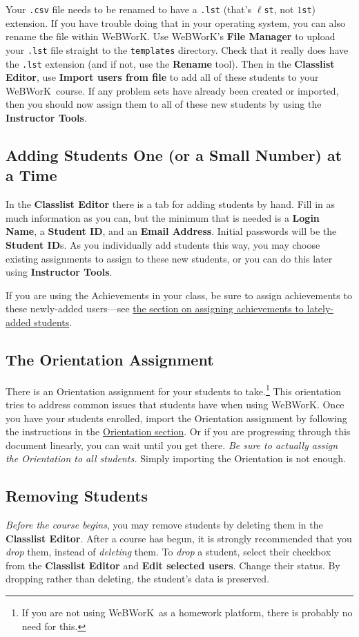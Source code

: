 \documentclass[12pt]{article}
\newcommand{\menu}[1]{\textbf{#1}}
\newcommand{\WW}{WeBWorK}
\begin{document}
Your \texttt{.csv} file needs to be renamed to have a \texttt{.lst} (that's $\ell$\texttt{st}, not
$1$\texttt{st}) extension. If you have trouble doing that in your operating system, you can also rename the file within \WW. Use \WW's \menu{File Manager} to upload your \texttt{.lst} file straight to the \texttt{templates} directory. Check that it really does have the \texttt{.lst} extension (and if not, use the \menu{Rename} tool). Then in the \menu{Classlist Editor}, use \menu{Import users from file} to add all of these students to your \WW\ course. If any problem sets have already been created or imported, then you should now assign them to all of these new students by using the \menu{Instructor Tools}.


\subsection{Adding Students One (or a Small Number) at a Time}
In the \menu{Classlist Editor} there is a tab for adding students by hand.  Fill in as much information as you can, but the minimum that is needed is a \menu{Login Name}, a \menu{Student ID}, and an \menu{Email Address}. Initial passwords will be the \menu{Student ID}s.  As you individually add students this way, you may choose existing assignments to assign to these new students, or you can do this later using \menu{Instructor Tools}.

If you are using the Achievements in your class, be sure to assign achievements to these newly-added users---see \hyperref[achievementslateaddstudents]{the section on assigning achievements to lately-added students}.

\subsection{The Orientation Assignment}
There is an Orientation assignment for your students to take.\footnote{If you are not using \WW\ as a homework platform, there is probably no need for this.} This orientation tries to address common issues that students have when using \WW. Once you have your students enrolled, import the Orientation assignment by following the instructions in the \hyperref[orientation]{Orientation section}. Or if you are progressing through this document linearly, you can wait until you get there. \emph{Be sure to actually assign the Orientation to all students.} Simply importing the Orientation is not enough.

\subsection{Removing Students}
\emph{Before the course begins}, you may remove students by deleting them in the \menu{Classlist Editor}. After a course has begun, it is strongly recommended that you \emph{drop} them, instead of \emph{deleting} them.  To \emph{drop} a student, select their checkbox from the \menu{Classlist Editor} and \menu{Edit selected users}.  Change their status.  By dropping rather than deleting, the student's data is preserved.
\end{document}
